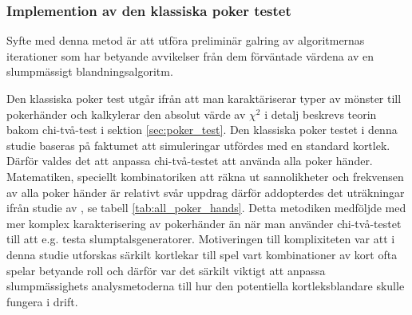 \documentclass[swedish,a4paper]{article}
\begin{document}






\subsubsection{Implemention av den klassiska poker testet}
\label{sec:poker_test_M}
Syfte med denna metod är att utföra preliminär galring av algoritmernas
iterationer som har betyande avvikelser från dem förväntade värdena av en slumpmässigt
blandningsalgoritm.  

Den klassiska poker test utgår ifrån att man karaktäriserar typer av mönster
till pokerhänder och kalkylerar  den absolut värde av $\chi^2$ i detalj beskrevs
teorin bakom chi-två-test  i sektion \ref{sec:poker_test}. Den klassiska poker
testet i denna studie baseras på faktumet att simuleringar utfördes med en
standard kortlek. Därför valdes det att anpassa chi-två-testet att använda alla
poker händer. Matematiken, speciellt kombinatoriken att räkna ut sannolikheter
och frekvensen av alla poker\- händer är relativt svår uppdrag därför
addopterdes det uträkningar ifrån studie av \textcite{Drew2006}, se tabell
\ref{tab:all_poker_hands}. Detta metodiken medföljde med mer komplex
karakterisering av poker\-händer än när man använder chi-två-testet till att
e.g. testa slumptalsgeneratorer. Motiveringen till komplixiteten var att i denna
studie utforskas särkilt kortlekar till spel vart kombinationer av kort ofta
spelar betyande roll och därför var det särkilt viktigt att anpassa
slumpmässighets analysmetoderna till hur den potentiella kortleksblandare skulle
fungera i drift.
\end{document}
